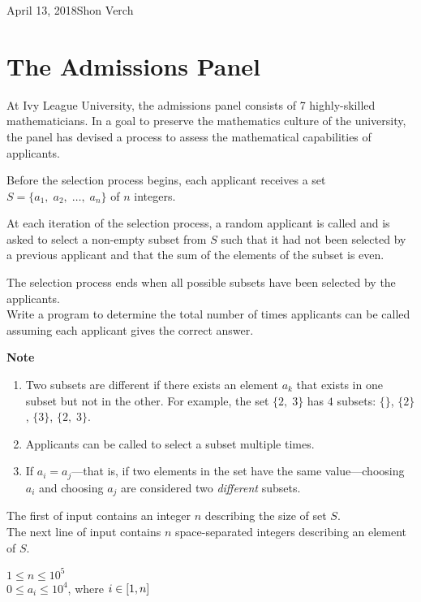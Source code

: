 

             {April 13, 2018}{Shon Verch}


\makeHeader

\section{The Admissions Panel}
At Ivy League University, the admissions panel consists of 7 highly-skilled mathematicians. In a goal to preserve the mathematics culture of the university, the panel has devised a process to assess the mathematical capabilities of applicants.

Before the selection process begins, each applicant receives a set $S = \{a_1,\;a_2,\;\ldots,\;a_n\}$ of $n $ integers. 

At each iteration of the selection process, a random applicant is called and is asked to select a non-empty subset from $S$ such that it had not been selected by a previous applicant and that the sum of the elements of the subset is even.

The selection process ends when all possible subsets have been selected by the applicants.\\

Write a program to determine the total number of times applicants can be called assuming each applicant gives the correct answer.

\noindent
\textbf{Note}
\begin{enumerate}
    \item Two subsets are different if there exists an element $a_k$ that exists in one subset but not in the other. For example, the set $\{2,\;3\}$ has $4$ subsets: $\{\}$, $\{2\}$, $\{3\}$, $\{2,\;3\}$.
    \item Applicants can be called to select a subset multiple times.
    \item If $a_i=a_j$---that is, if two elements in the set have the same value---choosing $a_i$ and choosing $a_j$ are considered two \textit{different} subsets.
\end{enumerate}

The first of input contains an integer $n$ describing the size of set $S$.\\
The next line of input contains $n$ space-separated integers describing an element of $S$.

\constraints
$1 \leq n \leq 10^5$\\
$0 \leq a_i \leq 10^4$, where $i \in \interval{1}{n}$

